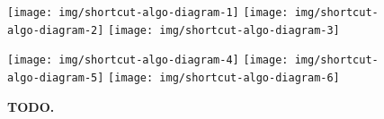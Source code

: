 \begin{figure*}

\centering
\texttt{[image: img/shortcut-algo-diagram-1]}%
\texttt{[image: img/shortcut-algo-diagram-2]}%
\texttt{[image: img/shortcut-algo-diagram-3]}

\texttt{[image: img/shortcut-algo-diagram-4]}%
\texttt{[image: img/shortcut-algo-diagram-5]}%
\texttt{[image: img/shortcut-algo-diagram-6]}

\caption{\textbf{TODO.}}
\label{fig:shortcut-algo-diagram}

\end{figure*}
